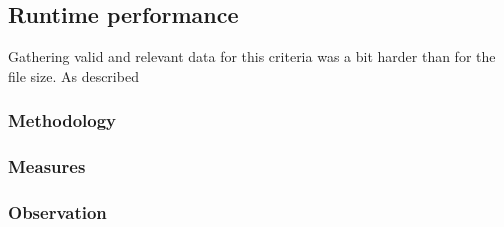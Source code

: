 \subsection{Runtime performance}
Gathering valid and relevant data for this criteria was a bit harder than for
the file size. As described 

\subsubsection{Methodology}

\subsubsection{Measures}

\subsubsection{Observation}
